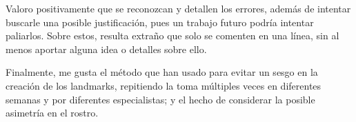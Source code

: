 \documentclass[13pt,a4paper]{article}
\begin{document}
\vspace{\baselineskip}

Valoro positivamente que se reconozcan y detallen los errores, además de intentar buscarle una posible justificación, pues un trabajo futuro podría intentar paliarlos.
Sobre estos, resulta extraño que solo se comenten en una línea, sin al menos aportar alguna idea o detalles sobre ello.

Finalmente, me gusta el método que han usado para evitar un sesgo en la creación de los landmarks, repitiendo la toma múltiples veces en diferentes semanas y por diferentes especialistas; y el hecho de considerar la posible asimetría en el rostro.


    \setlength{\parskip}{1em}
    \newpage
\end{document}
